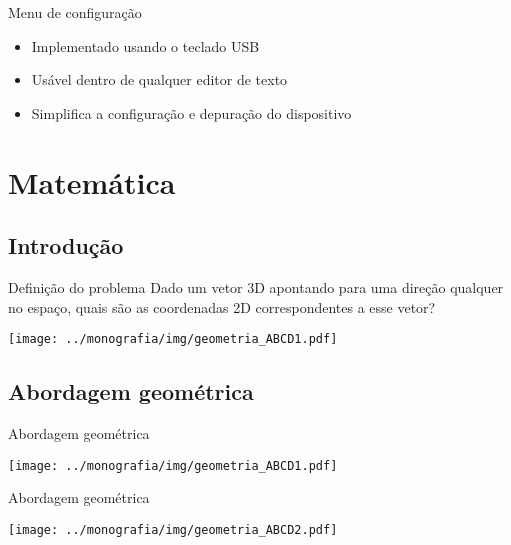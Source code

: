 \documentclass{beamer}
\begin{document}
\begin{frame}{Menu de configuração}
	\begin{itemize}
		\pause
		\item Implementado usando o teclado USB
		\pause
		\item Usável dentro de qualquer editor de texto
		\pause
		\item Simplifica a configuração e depuração do dispositivo
	\end{itemize}
\end{frame}


\section{Matemática}

\subsection{Introdução}

\begin{frame}{Definição do problema}
	\pause
	Dado um vetor 3D apontando para uma direção qualquer no espaço,
	quais são as coordenadas 2D correspondentes a esse vetor?
	\pause
	\bigskip
	\begin{center}
	\texttt{[image: ../monografia/img/geometria\_ABCD1.pdf]}
	\end{center}
\end{frame}


\subsection{Abordagem geométrica}

\begin{frame}{Abordagem geométrica}
	\begin{center}
	\texttt{[image: ../monografia/img/geometria\_ABCD1.pdf]}
	\end{center}
\end{frame}

\begin{frame}{Abordagem geométrica}
	\begin{center}
	\texttt{[image: ../monografia/img/geometria\_ABCD2.pdf]}
	\end{center}
\end{frame}
\end{document}
